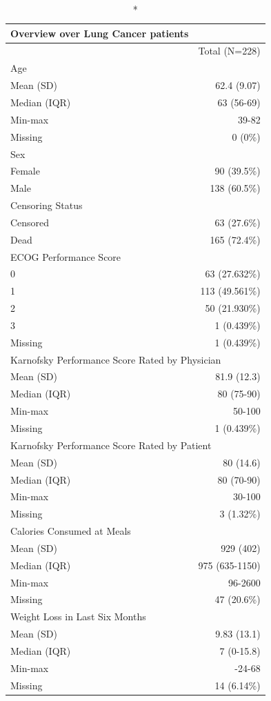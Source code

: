 \documentclass[
]{article}
\begin{document}
\setlength{\LTpost}{0mm}
\begin{longtable}{l|r}
\caption*{
{\large Overview over Lung Cancer patients}
} \\ 
\toprule
\multicolumn{1}{l}{} & Total (N=228) \\ 
\midrule
\multicolumn{2}{l}{Age} \\ 
\midrule
Mean (SD) & 62.4 (9.07) \\ 
Median (IQR) & 63 (56-69) \\ 
Min-max & 39-82 \\ 
Missing & 0 (0\%) \\ 
\midrule
\multicolumn{2}{l}{Sex} \\ 
\midrule
Female & 90 (39.5\%) \\ 
Male & 138 (60.5\%) \\ 
\midrule
\multicolumn{2}{l}{Censoring Status} \\ 
\midrule
Censored & 63 (27.6\%) \\ 
Dead & 165 (72.4\%) \\ 
\midrule
\multicolumn{2}{l}{ECOG Performance Score} \\ 
\midrule
0 & 63 (27.632\%) \\ 
1 & 113 (49.561\%) \\ 
2 & 50 (21.930\%) \\ 
3 & 1 (0.439\%) \\ 
Missing & 1 (0.439\%) \\ 
\midrule
\multicolumn{2}{l}{Karnofsky Performance Score Rated by Physician} \\ 
\midrule
Mean (SD) & 81.9 (12.3) \\ 
Median (IQR) & 80 (75-90) \\ 
Min-max & 50-100 \\ 
Missing & 1 (0.439\%) \\ 
\midrule
\multicolumn{2}{l}{Karnofsky Performance Score Rated by Patient} \\ 
\midrule
Mean (SD) & 80 (14.6) \\ 
Median (IQR) & 80 (70-90) \\ 
Min-max & 30-100 \\ 
Missing & 3 (1.32\%) \\ 
\midrule
\multicolumn{2}{l}{Calories Consumed at Meals} \\ 
\midrule
Mean (SD) & 929 (402) \\ 
Median (IQR) & 975 (635-1150) \\ 
Min-max & 96-2600 \\ 
Missing & 47 (20.6\%) \\ 
\midrule
\multicolumn{2}{l}{Weight Loss in Last Six Months} \\ 
\midrule
Mean (SD) & 9.83 (13.1) \\ 
Median (IQR) & 7 (0-15.8) \\ 
Min-max & -24-68 \\ 
Missing & 14 (6.14\%) \\ 
\bottomrule
\end{longtable}
\end{document}
